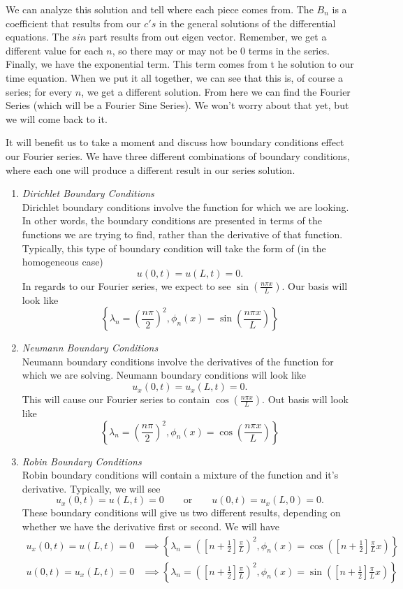 \documentclass{article}
\begin{document}
\noindent We can analyze this solution and tell where each piece comes from. The $B_{n}$ is a coefficient that results from our $c's$ in the general solutions of the differential equations. The $sin$ part results from out eigen vector. Remember, we get a different value for each $n$, so there may or may not be $0$ terms in the series. Finally, we have the exponential term. This term comes from t he solution to our time equation. When we put it all together, we can see that this is, of course a series; for every $n$, we get a different solution. From here we can find the Fourier Series (which will be a Fourier Sine Series). We won't worry about that yet, but we will come back to it.
\newpage


\indent It will benefit us to take a moment and discuss how boundary conditions effect our Fourier series. We have three different combinations of boundary conditions, where each one will produce a different result in our series solution.
\begin{enumerate}
\item \textit{Dirichlet Boundary Conditions}\\
Dirichlet boundary conditions involve the function for which we are looking. In other words, the boundary conditions are presented in terms of the functions we are trying to find, rather than the derivative of that function. Typically, this type of boundary condition will take the form of (in the homogeneous case)
\[u(0,t) = u(L,t) = 0.\]
In regards to our Fourier series, we expect to see $\sin{(\frac{n\pi x}{L})}$. Our basis will look like
\[
\left\{ \lambda_{n} = \left(\frac{n\pi}{2}\right)^{2}, \phi_{n}(x) = \sin{\left(\frac{n\pi x}{L}\right)} \right\}
\]
\item \textit{Neumann Boundary Conditions}\\
Neumann boundary conditions involve the derivatives of the function for which we are solving. Neumann boundary conditions will look like
\[u_{x}(0,t) = u_{x}(L,t) = 0.\]
This will cause our Fourier series to contain $\cos{(\frac{n\pi x}{L})}$. Out basis will look like
\[
\left\{ \lambda_{n} = \left(\frac{n\pi}{2}\right)^{2}, \phi_{n}(x) = \cos{\left(\frac{n\pi x}{L}\right)} \right\}
\]
\item \textit{Robin Boundary Conditions}\\
Robin boundary conditions will contain a mixture of the function and it's derivative. Typically, we will see
\[ u_{x}(0,t) = u(L,t) = 0\qquad \text{or}\qquad u(0,t) = u_{x}(L,0) = 0.\]
These boundary conditions will give us two different results, depending on whether we have the derivative first or second. We will have
\begin{align*}
u_{x}(0,t) = u(L,t) = 0 &\implies \left\{\lambda_{n} = \left(\left[n + \frac{1}{2}\right]\frac{\pi}{L}\right)^{2}, \phi_{n}(x) = \cos{\left(\left[n + \frac{1}{2}\right]\frac{\pi}{L}x\right)}\right\}\\
u(0,t) = u_{x}(L,t) = 0 &\implies \left\{\lambda_{n} = \left(\left[n + \frac{1}{2}\right]\frac{\pi}{L}\right)^{2}, \phi_{n}(x) =\sin{\left(\left[n + \frac{1}{2}\right]\frac{\pi}{L}x\right)}\right\}
\end{align*}
\end{enumerate}
\end{document}
